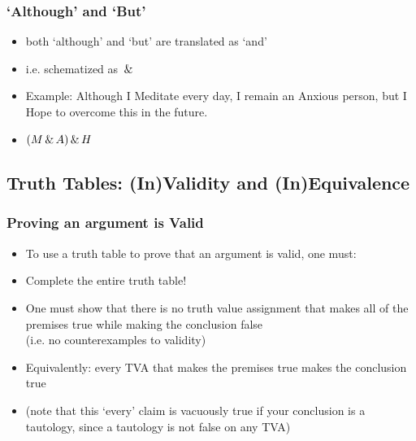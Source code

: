 \begin{frame}
\frametitle{`Although' and `But'}

\begin{itemize}[<+->]

\item both `although' and `but' are translated as `and'

\item i.e. schematized as $\,\&\,$

\item Example: Although I Meditate every day, I remain an Anxious person, but I Hope to overcome this in the future.

\item $(M \,\&\, A) \,\&\, H$ 


\end{itemize}
\end{frame}



\subsection{Truth Tables: (In)Validity and (In)Equivalence}

\begin{frame}
\frametitle{Proving an argument is Valid}

\begin{itemize}[<+->]

\item To use a truth table to prove that an argument is valid, one must:

\item Complete the entire truth table!

\item One must show that there is no truth value assignment that makes all of the premises true while making the conclusion false \\ (i.e. no counterexamples to validity)

\item Equivalently: every TVA that makes the premises true makes the conclusion true 

\item (note that this `every' claim is vacuously true if your conclusion is a tautology, since a tautology is not false on any TVA)

\end{itemize}
\end{frame}

